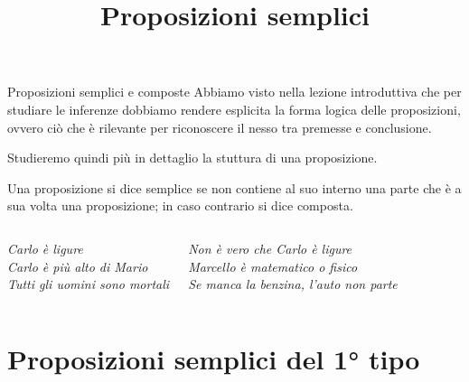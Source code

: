 \documentclass[10pt,dvipsnames]{beamer}
\title{Proposizioni semplici}
\begin{document}
\begin{frame}
\titlepage
\end{frame}

\begin{frame}{Proposizioni semplici e composte}
Abbiamo visto nella lezione introduttiva che per studiare le inferenze dobbiamo rendere esplicita la \alert{forma logica} delle proposizioni, ovvero ciò che è rilevante per riconoscere il nesso tra premesse e conclusione.

\medskip Studieremo quindi più in dettaglio la stuttura di una proposizione.

\pause
\begin{definition}
	Una proposizione si dice \alert{semplice} se non contiene al suo interno una parte che è a sua volta una proposizione; in caso contrario si dice \alert{composta}.
\end{definition}

\vspace*{-0.5cm}
\begin{columns}[t]
\begin{example}
	\itshape
	Carlo è ligure\\
	Carlo è più alto di Mario\\
	Tutti gli uomini sono mortali
\end{example}
	\begin{example}
		\itshape
		Non è vero che Carlo è ligure\\
		Marcello è matematico o fisico\\
		Se manca la benzina, l'auto non parte
	\end{example}
\end{columns}
\end{frame}

\section{Proposizioni semplici del 1° tipo}
\end{document}
